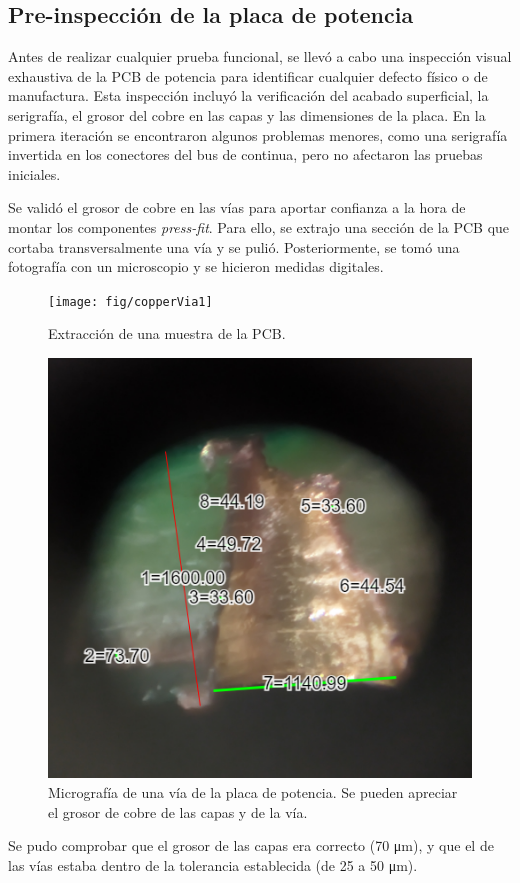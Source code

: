 \subsection{Pre-inspección de la placa de potencia}
Antes de realizar cualquier prueba funcional, se llevó a cabo una inspección visual exhaustiva de la PCB de potencia para identificar cualquier defecto físico o de manufactura. Esta inspección incluyó la verificación del acabado superficial, la serigrafía, el grosor del cobre en las capas y las dimensiones de la placa. En la primera iteración se encontraron algunos problemas menores, como una serigrafía invertida en los conectores del bus de continua, pero no afectaron las pruebas iniciales.

Se validó el grosor de cobre en las vías para aportar confianza a la hora de montar los componentes \textit{press-fit}. Para ello, se extrajo una sección de la PCB que cortaba transversalmente una vía y se pulió. Posteriormente, se tomó una fotografía con un microscopio y se hicieron medidas digitales.

\begin{figure}[H]
	\centering
	\texttt{[image: fig/copperVia1]}
	\caption{Extracción de una muestra de la PCB.}
\end{figure}


\begin{figure}[H]
	\centering
	\includegraphics[width=0.7\linewidth]{fig/copperVia}
	\caption{Micrografía de una vía de la placa de potencia. Se pueden apreciar el grosor de cobre de las capas y de la vía.}
\end{figure}

Se pudo comprobar que el grosor de las capas era correcto (70 \unit{\micro\meter}), y que el de las vías estaba dentro de la tolerancia establecida (de 25 a 50 \unit{\micro\meter}).

